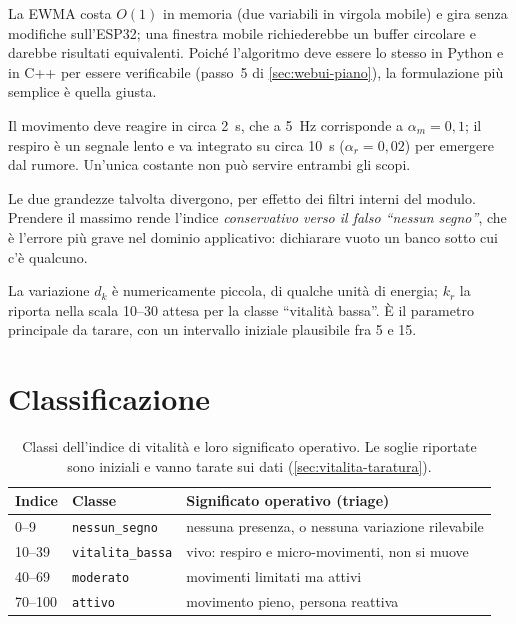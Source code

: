 \begin{description}[leftmargin=1.4em,style=nextline,itemsep=4pt]
  \item[Media esponenziale e non finestra mobile] La EWMA costa $O(1)$ in memoria
    (due variabili in virgola mobile) e gira senza modifiche sull'ESP32; una finestra
    mobile richiederebbe un buffer circolare e darebbe risultati equivalenti. Poiché
    l'algoritmo deve essere lo stesso in Python e in C++ per essere verificabile
    (passo~5 di \cref{sec:webui-piano}), la formulazione più semplice è quella
    giusta.
  \item[Due costanti di tempo diverse] Il movimento deve reagire in circa 2~s, che a
    5~Hz corrisponde a $\alpha_m = 0{,}1$; il respiro è un segnale lento e va
    integrato su circa 10~s ($\alpha_r = 0{,}02$) per emergere dal rumore. Un'unica
    costante non può servire entrambi gli scopi.
  \item[Massimo fra energia del bersaglio e del gate] Le due grandezze talvolta
    divergono, per effetto dei filtri interni del modulo. Prendere il massimo rende
    l'indice \emph{conservativo verso il falso ``nessun segno''}, che è l'errore più
    grave nel dominio applicativo: dichiarare vuoto un banco sotto cui c'è qualcuno.
  \item[Il coefficiente $k_r$] La variazione $d_k$ è numericamente piccola, di
    qualche unità di energia; $k_r$ la riporta nella scala 10--30 attesa per la classe
    ``vitalità bassa''. È il parametro principale da tarare, con un intervallo
    iniziale plausibile fra 5 e 15.
\end{description}

\section{Classificazione}
\label{sec:vitalita-classi}

\begin{table}[htbp]
\centering
\caption{Classi dell'indice di vitalità e loro significato operativo. Le soglie
riportate sono iniziali e vanno tarate sui dati (\cref{sec:vitalita-taratura}).}
\label{tab:vitalita-classi}
\small
\begin{tabularx}{\linewidth}{@{}llX@{}}
\toprule
\textbf{Indice} & \textbf{Classe} & \textbf{Significato operativo (triage)} \\
\midrule
0--9 & \texttt{nessun\_segno} & nessuna presenza, o nessuna variazione rilevabile \\
10--39 & \texttt{vitalita\_bassa} & vivo: respiro e micro-movimenti, non si muove \\
40--69 & \texttt{moderato} & movimenti limitati ma attivi \\
70--100 & \texttt{attivo} & movimento pieno, persona reattiva \\
\bottomrule
\end{tabularx}
\end{table}

